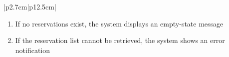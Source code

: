 \begin{table}[H]
\begin{tabular}{|p{2.7cm}|p{12.5cm}|}
\begin{minipage}[t]{\linewidth}
\begin{enumerate}[topsep=0pt,itemsep=1pt,parsep=0pt,partopsep=0pt]
                                          \item If no reservations exist, the system displays an empty-state message
                                          \item If the reservation list cannot be retrieved, the system shows an error
                                                notification
                                      \end{enumerate}
                                  \end{minipage}          \\
        \hline
    \end{tabular}
    \label{tab:admin-list-camera-reservations}
\end{table}
